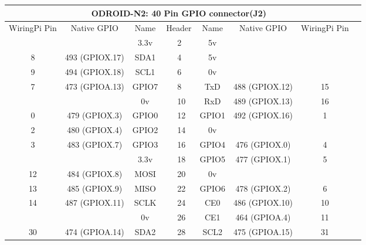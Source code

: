 \documentclass[11pt,a4paper]{article}
\begin{document}
\begin{sffamily}
\begin{center}
\begin{tabular}{|c|c|c||p{8mm}|p{8mm}||c|c|c|c|}
\hline
\multicolumn{8}{|c|}{\bfseries{ODROID-N2: 40 Pin GPIO connector(J2)}}\\
\hline
\hline
WiringPi Pin	& Native GPIO	& Name	& \multicolumn{2}{|c||}{Header}	& Name	& Native GPIO	& WiringPi Pin\\
\hline
\hline
	& 		& \textcolor{rtb-red}{3.3v}	& \raggedleft{1} &  2 & \textcolor{rtb-maroon}{5v}	& 		& \\
\hline
8	& 493 (GPIOX.17)	& \textcolor{rtb-aqua}{SDA1}	& \raggedleft{3} &  4 & \textcolor{rtb-maroon}{5v}		& 					& \\
\hline
9	& 494 (GPIOX.18)	& \textcolor{rtb-aqua}{SCL1}	& \raggedleft{5} &  6 & \textcolor{rtb-black}{0v}		& 					& \\
\hline
7	& 473 (GPIOA.13)	& \textcolor{rtb-green}{GPIO7}	& \raggedleft{7} &  8 & \textcolor{rtb-yellow}{TxD}		& 488 (GPIOX.12)	& 15\\
\hline
	&			 		& \textcolor{rtb-black}{0v}		& \raggedleft{9} & 10 & \textcolor{rtb-yellow}{RxD}		& 489 (GPIOX.13)	& 16\\
\hline
0	& 479 (GPIOX.3)		& \textcolor{rtb-green}{GPIO0}	& \raggedleft{11} & 12 & \textcolor{rtb-green}{GPIO1}	& 492 (GPIOX.16)	& 1\\
\hline
2	& 480 (GPIOX.4)		& \textcolor{rtb-green}{GPIO2}	& \raggedleft{13} & 14 & \textcolor{rtb-black}{0v}		& 					& \\
\hline
3	& 483 (GPIOX.7)		& \textcolor{rtb-green}{GPIO3}	& \raggedleft{15} & 16 & \textcolor{rtb-green}{GPIO4}	& 476 (GPIOX.0)		& 4\\
\hline
	& 					& \textcolor{rtb-red}{3.3v}		& \raggedleft{17} & 18 & \textcolor{rtb-green}{GPIO5}	& 477 (GPIOX.1)		& 5\\
\hline
12	& 484 (GPIOX.8)		& \textcolor{rtb-teal}{MOSI}	& \raggedleft{19} & 20 & \textcolor{rtb-black}{0v}		& 					& \\
\hline
13	& 485 (GPIOX.9)		& \textcolor{rtb-teal}{MISO}	& \raggedleft{21} & 22 & \textcolor{rtb-green}{GPIO6}	& 478 (GPIOX.2)		& 6\\
\hline
14	& 487 (GPIOX.11)	& \textcolor{rtb-teal}{SCLK}	& \raggedleft{23} & 24 & \textcolor{rtb-teal}{CE0}		& 486 (GPIOX.10)	& 10\\
\hline
	& 					& \textcolor{rtb-black}{0v}		& \raggedleft{25} & 26 & \textcolor{rtb-teal}{CE1}		& 464 (GPIOA.4)		& 11\\
\hline
30	& 474 (GPIOA.14)	& \textcolor{rtb-aqua}{SDA2}	& \raggedleft{27} & 28 & \textcolor{rtb-aqua}{SCL2}		& 475 (GPIOA.15)	& 31\\

\end{tabular}
\end{center}
\end{sffamily}
\end{document}
